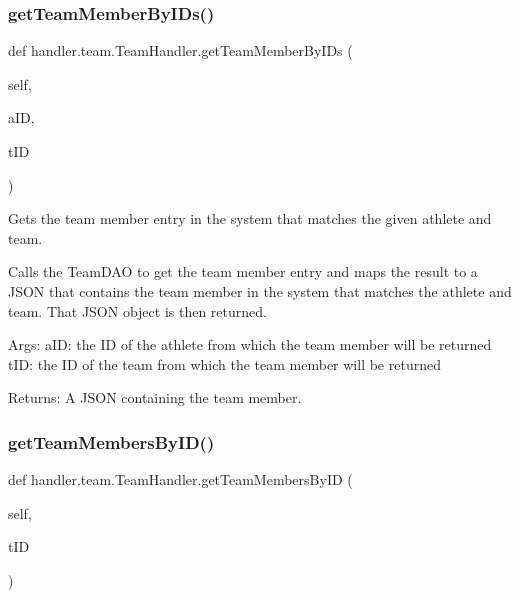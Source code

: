 \subsubsection{\texorpdfstring{get\+Team\+Member\+By\+I\+Ds()}{getTeamMemberByIDs()}}
{\footnotesize\ttfamily def handler.\+team.\+Team\+Handler.\+get\+Team\+Member\+By\+I\+Ds (\begin{DoxyParamCaption}\item[{}]{self,  }\item[{}]{a\+ID,  }\item[{}]{t\+ID }\end{DoxyParamCaption})}

\begin{DoxyVerb}Gets the team member entry in the system that matches the given athlete and team.  

Calls the TeamDAO to get the team member entry and maps the result
to a JSON that contains the team member in the system that matches the athlete and team. 
That JSON object is then returned.

Args:
    aID: the ID of the athlete from which the team member will be returned
    tID: the ID of the team from which the team member will be returned
    
Returns:
    A JSON containing the team member.
\end{DoxyVerb}
 \mbox{\label{classhandler_1_1team_1_1_team_handler_a01c7ec029ad084fb936ef9c90ef3a1c0}} 
\subsubsection{\texorpdfstring{get\+Team\+Members\+By\+I\+D()}{getTeamMembersByID()}}
{\footnotesize\ttfamily def handler.\+team.\+Team\+Handler.\+get\+Team\+Members\+By\+ID (\begin{DoxyParamCaption}\item[{}]{self,  }\item[{}]{t\+ID }\end{DoxyParamCaption})}


